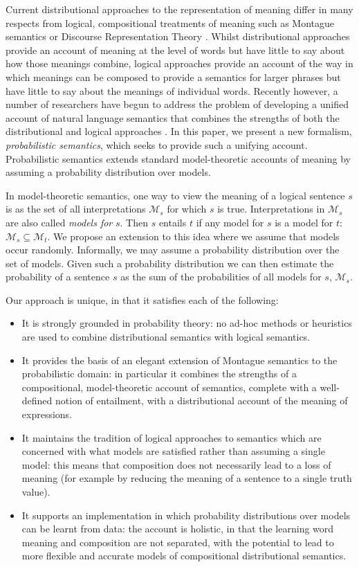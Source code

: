 \documentclass[letterpaper]{article}
\begin{document}
Current distributional approaches to the representation of meaning differ in many respects from logical, compositional treatments of meaning
such as Montague semantics or
Discourse Representation Theory \cite{Blackburn:05}. Whilst distributional approaches provide an account of meaning at the level of words but have little to say about how those meanings combine, logical approaches provide an account of the way in which meanings can be composed to provide a semantics for larger phrases but have little to say about the meanings of individual words.  Recently however, a number of researchers have begun to address the problem of  developing a unified account of natural language semantics that combines the strengths of both the distributional and logical approaches
\cite{Clarke:07,Coecke:10,Garrette:11,Lewis:13}.  In this paper, we present a new formalism, {\em probabilistic semantics\/}, which seeks to provide such a unifying
account. Probabilistic semantics extends standard model-theoretic
accounts of meaning by assuming a probability distribution over
models.  

In model-theoretic semantics, one way to view the meaning
of a logical sentence $s$ is as the set of all interpretations
$\mathcal{M}_s$ for which $s$ is true. Interpretations in $\mathcal{M}_s$ are also called {\em models for\/}
$s$. Then $s$ entails $t$ if any model for $s$ is a model for $t$: $\mathcal{M}_s \subseteq
\mathcal{M}_t$. We propose an extension to this idea where we assume
that models occur randomly. Informally, we may assume a probability
distribution over the set of models. Given such a probability distribution we can then estimate the
probability of a sentence $s$ as the sum of the probabilities of all
models for $s$, $\mathcal{M}_s$. 


Our approach is unique, in that it satisfies each of the following:
\begin{itemize}
\item It is strongly grounded in probability theory: no ad-hoc methods
  or heuristics are used to combine distributional semantics with
  logical semantics.
\item It provides the basis of an elegant extension of Montague semantics to the
  probabilistic domain: in particular it combines the strengths of a compositional, model-theoretic account of semantics, complete with a well-defined notion of entailment, with a distributional account of the meaning of expressions.
\item It maintains the tradition of logical approaches to semantics
  which are concerned with what models are satisfied rather than
  assuming a single model: this means that composition does not
  necessarily lead to a loss of meaning (for example by reducing the meaning of a
  sentence to a single truth value).
 \item It supports an implementation in which probability
distributions over models can be learnt from data: the account is holistic, in that the learning word meaning and composition are not separated, with
  the potential to lead to more flexible and accurate models of
  compositional distributional semantics.
\end{itemize}
\end{document}
